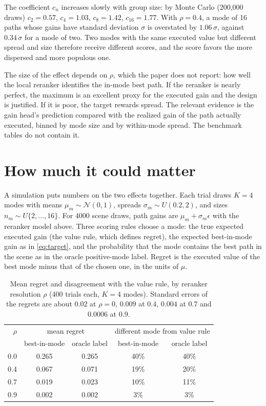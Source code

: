 \documentclass[11pt]{article}
\theoremstyle{definition}
\begin{document}
The coefficient $c_n$ increases slowly with group size: by Monte Carlo (200{,}000 draws) $c_2=0.57$, $c_4=1.03$, $c_8=1.42$, $c_{16}=1.77$. With $\rho=0.4$, a mode of 16 paths whose gains have standard deviation $\sigma$ is overstated by $1.06\,\sigma$, against $0.34\,\sigma$ for a mode of two. Two modes with the same executed value but different spread and size therefore receive different scores, and the score favors the more dispersed and more populous one.

The size of the effect depends on $\rho$, which the paper does not report: how well the local reranker identifies the in-mode best path. If the reranker is nearly perfect, the maximum is an excellent proxy for the executed gain and the design is justified. If it is poor, the target rewards spread. The relevant evidence is the gain head's prediction compared with the realized gain of the path actually executed, binned by mode size and by within-mode spread. The benchmark tables do not contain it.

\section{How much it could matter}

A simulation puts numbers on the two effects together. Each trial draws $K=4$ modes with means $\mu_m\sim\mathcal N(0,1)$, spreads $\sigma_m\sim U(0.2,2)$, and sizes $n_m\sim U\{2,\dots,16\}$. For $4000$ scene draws, path gains are $\mu_m+\sigma_m\epsilon$ with the reranker model above. Three scoring rules choose a mode: the true expected executed gain (the value rule, which defines regret), the expected best-in-mode gain as in \eqref{eq:target}, and the probability that the mode contains the best path in the scene as in the oracle positive-mode label. Regret is the executed value of the best mode minus that of the chosen one, in the units of $\mu$.

\begin{table}[h]
\centering
\caption{Mean regret and disagreement with the value rule, by reranker resolution $\rho$ (400 trials each, $K=4$ modes). Standard errors of the regrets are about $0.02$ at $\rho=0$, $0.009$ at $0.4$, $0.004$ at $0.7$ and $0.0006$ at $0.9$.}
\label{tab:regret}
\small
\begin{tabular}{rcccc}
\toprule
$\rho$ & \multicolumn{2}{c}{mean regret} & \multicolumn{2}{c}{different mode from value rule} \\
 & best-in-mode & oracle label & best-in-mode & oracle label \\
\midrule
0.0 & 0.265 & 0.265 & 40\% & 40\% \\
0.4 & 0.067 & 0.071 & 19\% & 20\% \\
0.7 & 0.019 & 0.023 & 10\% & 11\% \\
0.9 & 0.002 & 0.002 & 3\% & 3\% \\
\bottomrule
\end{tabular}
\end{table}
\end{document}
